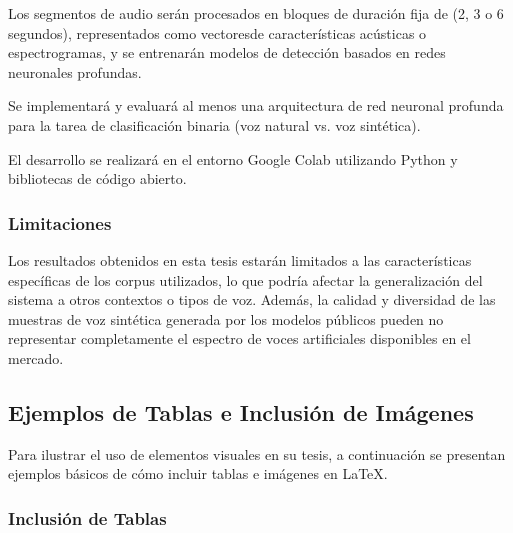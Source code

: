 Los segmentos de audio serán procesados en bloques de duración fija de (2, 3 o 6 segundos),  representados como vectoresde características acústicas o espectrogramas, y se entrenarán modelos de detección basados en redes neuronales profundas.

Se implementará y evaluará al menos una arquitectura de red neuronal profunda para la tarea de clasificación binaria (voz natural vs. voz sintética).

El desarrollo se realizará en el entorno Google Colab utilizando Python y bibliotecas de código abierto.


\subsubsection{Limitaciones}
\label{subsec:limitaciones}

Los resultados obtenidos en esta tesis estarán limitados a las características específicas de los corpus utilizados, lo que podría afectar la generalización del sistema a otros contextos o tipos de voz. Además, la calidad y diversidad de las muestras de voz sintética generada por los modelos públicos pueden no representar completamente el espectro de voces artificiales disponibles en el mercado.


\subsection{Ejemplos de Tablas e Inclusión de Imágenes}
\label{sec:ejemplos_elementos}

Para ilustrar el uso de elementos visuales en su tesis, a continuación se presentan ejemplos básicos de cómo incluir tablas e imágenes en LaTeX.

\subsubsection{Inclusión de Tablas}

